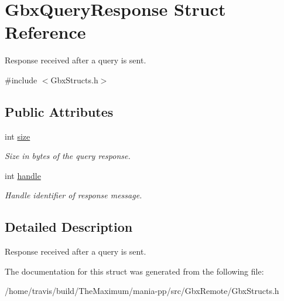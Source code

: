 \hypertarget{structGbxQueryResponse}{\section{Gbx\-Query\-Response Struct Reference}
\label{structGbxQueryResponse}
}


Response received after a query is sent.  




{\ttfamily \#include $<$Gbx\-Structs.\-h$>$}

\subsection*{Public Attributes}
\begin{DoxyCompactItemize}
\item 
\hypertarget{structGbxQueryResponse_a0633cc01128e5eee2edba3ee503db1c4}{int \hyperlink{structGbxQueryResponse_a0633cc01128e5eee2edba3ee503db1c4}{size}}\label{structGbxQueryResponse_a0633cc01128e5eee2edba3ee503db1c4}

\begin{DoxyCompactList}\small\item\em Size in bytes of the query response. \end{DoxyCompactList}\item 
\hypertarget{structGbxQueryResponse_a0f13a7b1745dcf1f7e17c0bc3a0acecb}{int \hyperlink{structGbxQueryResponse_a0f13a7b1745dcf1f7e17c0bc3a0acecb}{handle}}\label{structGbxQueryResponse_a0f13a7b1745dcf1f7e17c0bc3a0acecb}

\begin{DoxyCompactList}\small\item\em Handle identifier of response message. \end{DoxyCompactList}\end{DoxyCompactItemize}


\subsection{Detailed Description}
Response received after a query is sent. 

The documentation for this struct was generated from the following file\-:\begin{DoxyCompactItemize}
\item 
/home/travis/build/\-The\-Maximum/mania-\/pp/src/\-Gbx\-Remote/Gbx\-Structs.\-h\end{DoxyCompactItemize}
